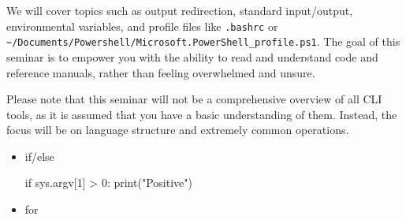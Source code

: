 \documentclass[
  letterpaper,
  DIV=11,
  numbers=noendperiod]{scrartcl}
\newenvironment{Shaded}{\begin{snugshade}}{\end{snugshade}}
\newcommand{\BuiltInTok}[1]{\textcolor[rgb]{0.00,0.23,0.31}{#1}}
\newcommand{\ControlFlowTok}[1]{\textcolor[rgb]{0.00,0.23,0.31}{#1}}
\newcommand{\DataTypeTok}[1]{\textcolor[rgb]{0.68,0.00,0.00}{#1}}
\newcommand{\DecValTok}[1]{\textcolor[rgb]{0.68,0.00,0.00}{#1}}
\newcommand{\FunctionTok}[1]{\textcolor[rgb]{0.28,0.35,0.67}{#1}}
\newcommand{\KeywordTok}[1]{\textcolor[rgb]{0.00,0.23,0.31}{#1}}
\newcommand{\NormalTok}[1]{\textcolor[rgb]{0.00,0.23,0.31}{#1}}
\newcommand{\OperatorTok}[1]{\textcolor[rgb]{0.37,0.37,0.37}{#1}}
\newcommand{\OtherTok}[1]{\textcolor[rgb]{0.00,0.23,0.31}{#1}}
\newcommand{\StringTok}[1]{\textcolor[rgb]{0.13,0.47,0.30}{#1}}
\newcommand{\VariableTok}[1]{\textcolor[rgb]{0.07,0.07,0.07}{#1}}
\begin{document}
We will cover topics such as output redirection, standard input/output,
environmental variables, and profile files like \texttt{.bashrc} or
\texttt{\textasciitilde{}/Documents/Powershell/Microsoft.PowerShell\_profile.ps1}.
The goal of this seminar is to empower you with the ability to read and
understand code and reference manuals, rather than feeling overwhelmed
and unsure.

Please note that this seminar will not be a comprehensive overview of
all CLI tools, as it is assumed that you have a basic understanding of
them. Instead, the focus will be on language structure and extremely
common operations.

\begin{itemize}
\item
  if/else

\begin{Shaded}
\end{Shaded}

\begin{Shaded}
\begin{Highlighting}[]
\ControlFlowTok{if}\NormalTok{ sys.argv[}\DecValTok{1}\NormalTok{] }\OperatorTok{\textgreater{}} \DecValTok{0}\NormalTok{:}
  \BuiltInTok{print}\NormalTok{(}\StringTok{"Positive"}\NormalTok{)}
\end{Highlighting}
\end{Shaded}

\begin{Shaded}
\end{Shaded}
\item
  for

\begin{Shaded}
\end{Shaded}


\end{itemize}
\end{document}
